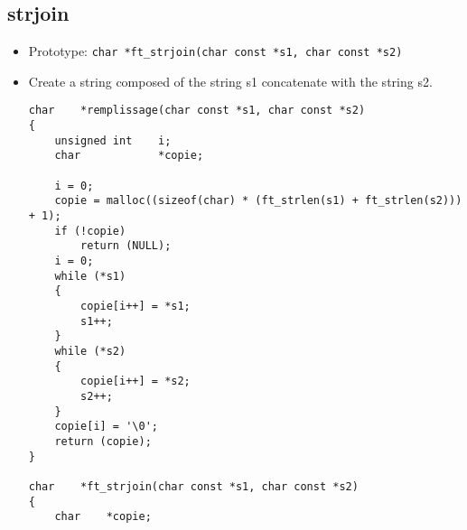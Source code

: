 \documentclass{article}
\begin{document}
	\subsection{strjoin}
		\begin{itemize}[label=$\rightarrow$]
			\item Prototype: \texttt{char    *ft\_strjoin(char const *s1, char const *s2)}
			\item Create a string composed of the string s1 concatenate with the string s2.
			\begin{verbatim}
char    *remplissage(char const *s1, char const *s2)                            
{                                                                               
    unsigned int    i;                                                          
    char            *copie;                                                     
                                                                                
    i = 0;                                                                      
    copie = malloc((sizeof(char) * (ft_strlen(s1) + ft_strlen(s2))) + 1);       
    if (!copie)                                                                 
        return (NULL);                                                          
    i = 0;                                                                      
    while (*s1)                                                                 
    {                                                                           
        copie[i++] = *s1;                                                       
        s1++;                                                                   
    }                                                                           
    while (*s2)                                                                 
    {                                                                           
        copie[i++] = *s2;                                                       
        s2++;                                                                   
    }                                                                           
    copie[i] = '\0';                                                            
    return (copie);                                                             
}                                                                               
                                                                                
char    *ft_strjoin(char const *s1, char const *s2)                             
{                                                                               
    char    *copie;                                                             
                                                                                

\end{verbatim}
\end{itemize}
\end{document}
